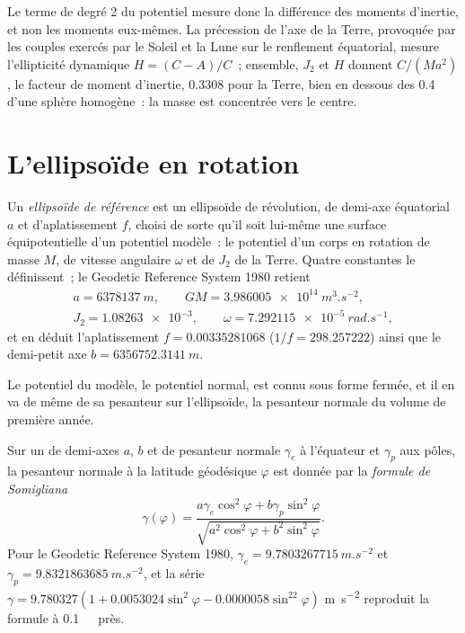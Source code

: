 Le terme de degré 2 du potentiel mesure donc la différence des
moments d'inertie, et non les moments eux-mêmes. La précession de l'axe de la
Terre, provoquée par les couples exercés par le Soleil et la Lune sur le renflement
équatorial, mesure l'ellipticité dynamique $H = (C - A)/C$~; ensemble, $J_2$ et $H$ donnent
$C/(Ma^2)$, le facteur de moment d'inertie, \num{0.3308} pour la Terre,
bien en dessous des \num{0.4} d'une sphère homogène~: la masse est concentrée vers
le centre.

\section{L'ellipsoïde en rotation}

\begin{definition}\label{def:b3:gravity-geodesy:ellipsoid}
Un \emph{ellipsoïde de référence} est un ellipsoïde de
révolution, de demi-axe équatorial $a$ et d'aplatissement $f$, choisi de sorte qu'il
soit lui-même une surface équipotentielle d'un potentiel modèle~: le potentiel d'un
corps en rotation de masse $M$, de vitesse angulaire $\omega$ et de  $J_2$ de la Terre. Quatre constantes le définissent~; le Geodetic Reference
System 1980 retient
\begin{gather*}
  a = \qty{6378137}{m},\qquad GM = \qty{3.986005e14}{m^3.s^{-2}},\\
  J_2 = \num{1.08263e-3},\qquad \omega = \qty{7.292115e-5}{rad.s^{-1}},
\end{gather*}
et en déduit l'aplatissement $f = \num{0.00335281068}$
($1/f = \num{298.257222}$) ainsi que le demi-petit axe
$b = \qty{6356752.3141}{m}$.
\end{definition}

Le potentiel du modèle, le potentiel normal, est connu sous forme fermée, et il en va de même de
sa pesanteur sur l'ellipsoïde, la pesanteur normale du volume de première année.

\begin{proposition}\label{prop:b3:gravity-geodesy:somigliana}
Sur un  de demi-axes $a$, $b$ et de pesanteur normale
$\gamma_e$ à l'équateur et $\gamma_p$ aux pôles, la pesanteur normale à la
latitude géodésique $\varphi$ est donnée par la \emph{formule de
Somigliana}
\[
  \gamma(\varphi) = \frac{a\gamma_e\cos^2\varphi + b\gamma_p\sin^2\varphi}
  {\sqrt{a^2\cos^2\varphi + b^2\sin^2\varphi}} .
\]
Pour le Geodetic Reference System 1980, $\gamma_e = \qty{9.7803267715}{m.s^{-2}}$
et $\gamma_p = \qty{9.8321863685}{m.s^{-2}}$, et la série
$\gamma = 9.780327(1 + 0.0053024\sin^2\varphi - 0.0000058\sin^22\varphi)$
\unit{m.s^{-2}} reproduit la formule à \qty{0.1}{\milli\gal}~près.
\end{proposition}
\admitted

